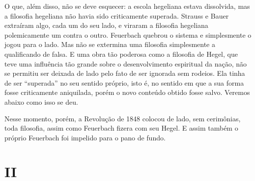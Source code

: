 O que, além disso, não se deve esquecer: a escola
hegeliana estava dissolvida, mas a filosofia hegeliana não havia sido criticamente
superada. Strauss e Bauer extraíram
algo, cada um do seu lado, e viraram a filosofia hegeliana polemicamente
um contra o
outro. Feuerbach quebrou
o sistema e simplesmente o jogou para o lado. Mas não se extermina uma
filosofia simplesmente a qualificando de falsa. E uma obra tão poderosa
como a filosofia
de Hegel,
que teve uma influência tão grande sobre o desenvolvimento espiritual da
nação, não se permitiu ser deixada de lado pelo fato de ser ignorada sem
rodeios. Ela tinha de ser ``superada'' no seu sentido 
próprio, isto é, no sentido em que a sua forma fosse criticamente
aniquilada, porém o novo conteúdo obtido fosse salvo.
Veremos abaixo como isso se deu.

Nesse momento, porém, a Revolução de 1848 colocou de lado, sem %
cerimônias, toda filosofia, assim como Feuerbach fizera com seu Hegel. E assim também o próprio Feuerbach foi impelido para o pano de fundo.

\quebra

\mbox{}
\vspace{2cm}

\section{II}

